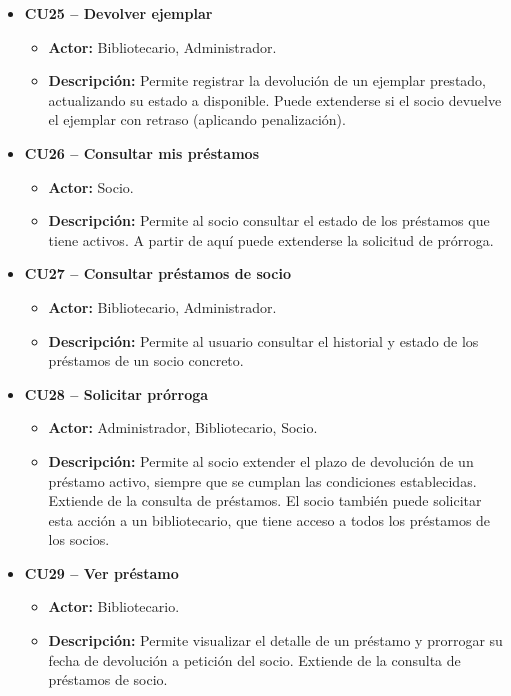 \begin{itemize}
	\item \textbf{CU25 -- Devolver ejemplar}
	\begin{itemize}
		\item \textbf{Actor:} Bibliotecario, Administrador.
		\item \textbf{Descripción:} Permite registrar la devolución de un ejemplar prestado, actualizando su estado a disponible. Puede extenderse si el socio devuelve el ejemplar con retraso (aplicando penalización).
	\end{itemize}
	
	\item \textbf{CU26 -- Consultar mis préstamos}
	\begin{itemize}
		\item \textbf{Actor:} Socio.
		\item \textbf{Descripción:} Permite al socio consultar el estado de los préstamos que tiene activos. A partir de aquí puede extenderse la solicitud de prórroga.
	\end{itemize}
	
	\item \textbf{CU27 -- Consultar préstamos de socio}
	\begin{itemize}
		\item \textbf{Actor:} Bibliotecario, Administrador.
		\item \textbf{Descripción:} Permite al usuario consultar el historial y estado de los préstamos de un socio concreto.
	\end{itemize}
	
	
	\item \textbf{CU28 -- Solicitar prórroga}
	\begin{itemize}
		\item \textbf{Actor:} Administrador, Bibliotecario, Socio.
		\item \textbf{Descripción:} Permite al socio extender el plazo de devolución de un préstamo activo, siempre que se cumplan las condiciones establecidas. Extiende de la consulta de préstamos. El socio también puede solicitar esta acción a un bibliotecario, que tiene acceso a todos los préstamos de los socios.
	\end{itemize}

	\item \textbf{CU29 -- Ver préstamo}
	\begin{itemize}
		\item \textbf{Actor:} Bibliotecario.
		\item \textbf{Descripción:} Permite visualizar el detalle de un préstamo y prorrogar su fecha de devolución a petición del socio. Extiende de la consulta de préstamos de socio.
	\end{itemize}
	
\end{itemize}

